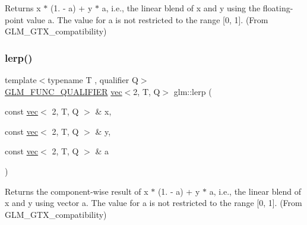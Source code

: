 Returns x $\ast$ (1. -\/ a) + y $\ast$ a, i.\+e., the linear blend of x and y using the floating-\/point value a. The value for a is not restricted to the range \mbox{[}0, 1\mbox{]}. (From G\+L\+M\+\_\+\+G\+T\+X\+\_\+compatibility) 

\mbox{\label{group__gtx__compatibility_gaf68de5baf72d16135368b8ef4f841604}} 
\subsubsection{\texorpdfstring{lerp()}{lerp()}\hspace{0.1cm}{\footnotesize\ttfamily [5/7]}}
{\footnotesize\ttfamily template$<$typename T , qualifier Q$>$ \\
\hyperlink{setup_8hpp_a33fdea6f91c5f834105f7415e2a64407}{G\+L\+M\+\_\+\+F\+U\+N\+C\+\_\+\+Q\+U\+A\+L\+I\+F\+I\+ER} \hyperlink{structglm_1_1vec}{vec}$<$2, T, Q$>$ glm\+::lerp (\begin{DoxyParamCaption}\item[{const \hyperlink{structglm_1_1vec}{vec}$<$ 2, T, Q $>$ \&}]{x,  }\item[{const \hyperlink{structglm_1_1vec}{vec}$<$ 2, T, Q $>$ \&}]{y,  }\item[{const \hyperlink{structglm_1_1vec}{vec}$<$ 2, T, Q $>$ \&}]{a }\end{DoxyParamCaption})}



Returns the component-\/wise result of x $\ast$ (1. -\/ a) + y $\ast$ a, i.\+e., the linear blend of x and y using vector a. The value for a is not restricted to the range \mbox{[}0, 1\mbox{]}. (From G\+L\+M\+\_\+\+G\+T\+X\+\_\+compatibility) 

\mbox{\label{group__gtx__compatibility_ga4ae1a616c8540a2649eab8e0cd051bb3}} 
